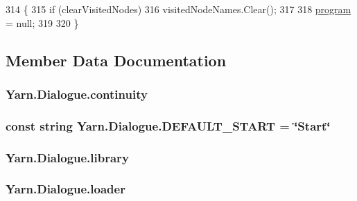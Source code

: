 \begin{DoxyCode}
314                                                              \{
315             \textcolor{keywordflow}{if} (clearVisitedNodes)
316                 visitedNodeNames.Clear();
317 
318             \hyperlink{a00036_a0a1cca92325f430425d784d416cb5c2b}{program} = null;
319 
320         \}
\end{DoxyCode}


\subsection{Member Data Documentation}
\hypertarget{a00036_ae94eaa4b03b432422f5d205fabe37ff5}{
\subsubsection[{continuity}]{ Yarn.\-Dialogue.\-continuity\hspace{0.3cm}{\ttfamily [package]}}}\label{a00036_ae94eaa4b03b432422f5d205fabe37ff5}
\hypertarget{a00036_a1b643f15f734090e6a58cbf13dafd28f}{
\subsubsection[{D\-E\-F\-A\-U\-L\-T\-\_\-\-S\-T\-A\-R\-T}]{\setlength{\rightskip}{0pt plus 5cm}const string Yarn.\-Dialogue.\-D\-E\-F\-A\-U\-L\-T\-\_\-\-S\-T\-A\-R\-T = \char`\"{}Start\char`\"{}}}\label{a00036_a1b643f15f734090e6a58cbf13dafd28f}
\hypertarget{a00036_ae660d4cfb6e296358d2f61d8ee74c66a}{
\subsubsection[{library}]{ Yarn.\-Dialogue.\-library}}\label{a00036_ae660d4cfb6e296358d2f61d8ee74c66a}
\hypertarget{a00036_a98bbe0ac2ccadeeeb7e05e3e6e19f2e0}{
\subsubsection[{loader}]{ Yarn.\-Dialogue.\-loader\hspace{0.3cm}{\ttfamily [private]}}}\label{a00036_a98bbe0ac2ccadeeeb7e05e3e6e19f2e0}
